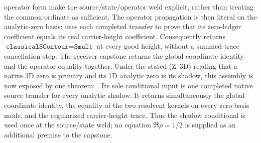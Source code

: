 operator form
 make the
source/state/operator weld explicit, rather than treating the common
ordinate as sufficient.
The operator propagation is then literal on the analytic-zero basis:
uses each completed transfer to prove that its zero-ledger coefficient equals
its real carrier-height coefficient.  Consequently
 returns
\(\texttt{classicalSContour}=\texttt{Smult}\) at every good height, without a
summed-trace cancellation step.  The receiver capstone
returns the global coordinate identity and the operator equality together.
Under the stated (Z--3D) reading that a native 3D zero is primary and its 1D
analytic zero is its shadow, this assembly is now exposed by one theorem:
.
Its sole conditional input is one completed native source transfer for every
analytic shadow.  It returns simultaneously the global coordinate identity,
the equality of the two resolvent kernels on every zero basis mode, and the
regularized carrier-height trace.  Thus the shadow conditional is used once
at the source/state weld; no equation \(\Re\rho=1/2\) is supplied as an
additional premise to the capstone.

